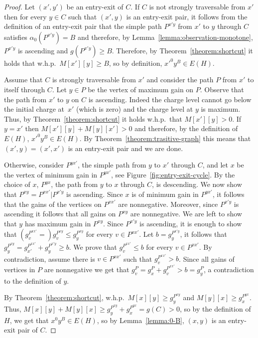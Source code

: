 \documentclass[11pt]{article}
\begin{document}
\begin{proof}
    Let $(x',y')$ be an entry-exit of $C$. If $C$ is not strongly traversable from $x'$  then for every $y\in C$ such that $(x',y)$ is an entry-exit pair, it follows from the definition of an entry-exit pair that the simple path $P^{x'y}$ from $x'$ to $y$ through $C$ satisfies $\alpha_0(P^{x'y})=B$ and therefore, by Lemma~\ref{lemma:observation-monotone}, $P^{x'y}$ is ascending and $g(P^{x'y})\ge B$. Therefore, by Theorem~\ref{theorem:shortcut} it holds that w.h.p.\ $M[x'][y] \ge B$, so by definition, $x'^0 y^B \in E(H)$.
    
    Assume that $C$ is strongly traversable from $x'$ and consider the path $P$ from $x'$ to itself through $C$. Let $y\in P$ be the vertex of maximum gain on $P$. Observe that the path from $x'$ to $y$ on $C$ is ascending. Indeed the charge level cannot go below the initial charge at~$x'$ (which is zero) and the charge level at $y$ is maximum. Thus, by Theorem~\ref{theorem:shortcut} it holds w.h.p.\ that $M[x'][y] > 0$. If $y=x'$ then $M[x'][y]+M[y][x'] > 0 $ and therefore, by the definition of $E(H)$, $x'^0 y^B \in E(H)$. By Theorem~\ref{theorem:trasitive-graph} this means that $(x',y)=(x',x')$ is an entry-exit pair and we are done. 
    
    Otherwise, consider $P^{yx'}$, the simple path from $y$ to $x'$ through $C$, and let $x$ be the vertex of minimum gain in $P^{yx'}$, see Figure~\ref{fig:entry-exit-cycle}. By the choice of $x$, $P^{yx}$, the path from $y$ to $x$ through $C$, is descending. We now show that $P^{xy}=P^{xx'}|P^{x'y}$ is ascending. Since $x$ is of minimum gain in $P^{yx'}$, it follows that the gains of the vertices on $P^{xx'}$ are nonnegative. Moreover, since $P^{x'y}$ is ascending it follows that all gains on $P^{xy}$ are nonnegative. We are left to show that $y$ has maximum gain in $P^{xy}$. Since $P^{x'y}$ is ascending, it is enough to show that $(g^{P^{xx'}}_v = ) g^{P^{xy}}_v \le g^{P^{xy}}_{y}$ for every $v \in P^{xx'}$. Let $b = g^{P^{x'y}}_{y}$, it follows that $g^{P^{xy}}_{y} = g^{P^{xx'}}_{x'}+g^{P^{x'y}}_{y} \ge b$. We prove that $g^{P^{xx'}}_v \le b$ for every $v \in P^{xx'}$.
    By contradiction, assume there is $v\in P^{xx'}$ such that $g^{P^{xx'}}_v > b$. Since all gains of vertices in $P$ are nonnegative we get  that $g^{P}_v = g^{P}_{x} + g^{P^{xx'}}_v > b = g^{P}_{y}$, a contradiction to the definition of $y$.  
    
    By Theorem~\ref{theorem:shortcut}, w.h.p.\ $M[x][y]\ge g^{P^{xy}}_{y}$ and $M[y][x]\ge g^{P^{yx}}_{x}$. Thus,  $M[x][y]+M[y][x]\ge g^{P^{xy}}_{y}  + g^{P^{yx}}_{x} = g(C) > 0$, so by the definition of $H$, we get that ${x}^0 {y}^B \in E(H)$, so by Lemma~\ref{lemma:0-B}, $(x,y)$ is an entry-exit pair of $C$. 
\end{proof}
\end{document}
